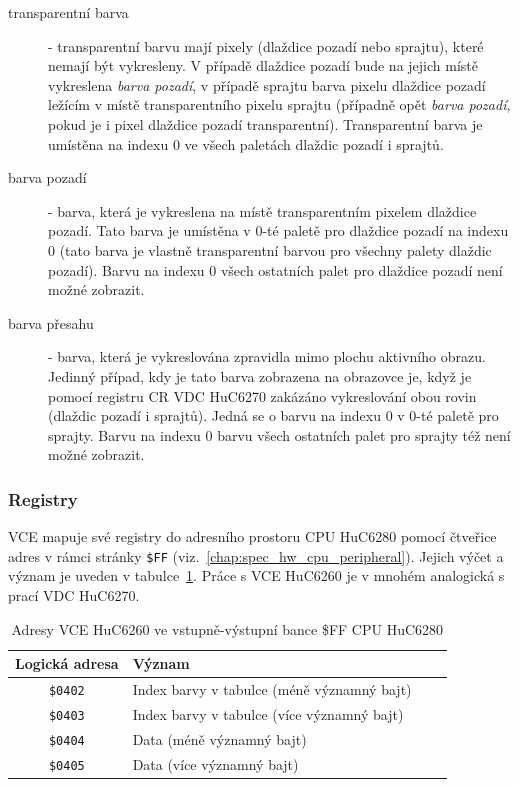\begin{description}
\item[transparentní barva] - transparentní barvu mají pixely (dlaždice pozadí
	nebo sprajtu), které nemají být vykresleny. V případě dlaždice pozadí bude
	na jejich místě vykreslena {\em barva pozadí}, v případě sprajtu barva
	pixelu dlaždice pozadí ležícím v místě transparentního pixelu sprajtu
	(případně opět {\em barva pozadí}, pokud je i pixel dlaždice pozadí
	transparentní). Transparentní barva je umístěna na indexu 0 ve všech
	paletách dlaždic pozadí i sprajtů.

\item[barva pozadí] - barva, která je vykreslena na místě 
	transparentním pixelem dlaždice pozadí. Tato barva je umístěna v 0-té
	paletě pro dlaždice pozadí na indexu 0 (tato barva je vlastně transparentní
	barvou pro všechny palety dlaždic pozadí). Barvu na indexu 0 všech
	ostatních palet pro dlaždice pozadí není možné zobrazit.

\item[barva přesahu] - barva, která je vykreslována zpravidla mimo plochu
	aktivního obrazu. Jedinný případ, kdy je tato barva zobrazena na obrazovce
	je, když je pomocí registru {\sf CR} VDC HuC6270 zakázáno vykreslování obou
	rovin (dlaždic pozadí i sprajtů). Jedná se o barvu na indexu 0 v 0-té
	paletě pro sprajty. Barvu na indexu 0 barvu všech ostatních palet pro
	sprajty též není možné zobrazit.
\end{description}


\subsubsection{Registry}\label{chap:spec_hw_vce_regs}

VCE mapuje své registry do adresního prostoru CPU HuC6280 pomocí čtveřice adres
v rámci stránky {\tt \$FF} (viz.~\ref{chap:spec_hw_cpu_peripheral}). Jejich výčet a
význam je uveden v tabulce~\ref{tab:vce_ffpage}. Práce s VCE HuC6260 je v
mnohém analogická s prací VDC HuC6270.

\begin{table}[ht]
\begin{center}
\begin{tabular}{|c|l|l|l|}
\hline
\textbf{Logická adresa} & \textbf{Význam} \\
\hline
	{\tt \$0402} & Index barvy v tabulce (méně významný bajt) \\
	{\tt \$0403} & Index barvy v tabulce (více významný bajt) \\
	{\tt \$0404} & Data (méně významný bajt) \\
	{\tt \$0405} & Data (více významný bajt) \\
\hline
\end{tabular}
\end{center}
	\caption{Adresy VCE HuC6260 ve vstupně-výstupní bance \$FF CPU
	HuC6280\label{tab:vce_ffpage}}
\end{table}

